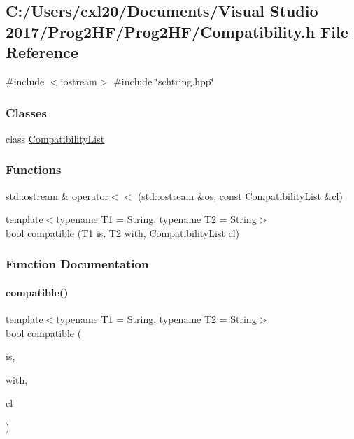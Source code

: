 \subsection{C\+:/\+Users/cxl20/\+Documents/\+Visual Studio 2017/\+Prog2\+H\+F/\+Prog2\+H\+F/\+Compatibility.h File Reference}
\label{_compatibility_8h}
{\ttfamily \#include $<$iostream$>$}\newline
{\ttfamily \#include \char`\"{}schtring.\+hpp\char`\"{}}\newline
\subsubsection*{Classes}
\begin{DoxyCompactItemize}
\item 
class \mbox{\hyperlink{class_compatibility_list}{Compatibility\+List}}
\end{DoxyCompactItemize}
\subsubsection*{Functions}
\begin{DoxyCompactItemize}
\item 
std\+::ostream \& \mbox{\hyperlink{_compatibility_8h_a4dba78c90980468354692db49af6847b}{operator$<$$<$}} (std\+::ostream \&os, const \mbox{\hyperlink{class_compatibility_list}{Compatibility\+List}} \&cl)
\item 
{\footnotesize template$<$typename T1  = String, typename T2  = String$>$ }\\bool \mbox{\hyperlink{_compatibility_8h_ae30040cca6deee0e7e5b61b08de81637}{compatible}} (T1 is, T2 with, \mbox{\hyperlink{class_compatibility_list}{Compatibility\+List}} cl)
\end{DoxyCompactItemize}


\subsubsection{Function Documentation}
\mbox{\label{_compatibility_8h_ae30040cca6deee0e7e5b61b08de81637}} 
\paragraph{\texorpdfstring{compatible()}{compatible()}}
{\footnotesize\ttfamily template$<$typename T1  = String, typename T2  = String$>$ \\
bool compatible (\begin{DoxyParamCaption}\item[{T1}]{is,  }\item[{T2}]{with,  }\item[{\mbox{\hyperlink{class_compatibility_list}{Compatibility\+List}}}]{cl }\end{DoxyParamCaption})}

